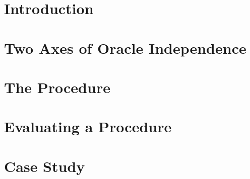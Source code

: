 \documentclass[sigconf,review,anonymous]{acmart}
\begin{document}
\maketitle

\section{Introduction}


\section{Two Axes of Oracle Independence}


\section{The Procedure}


\section{Evaluating a Procedure}


\section{Case Study}

\end{document}
